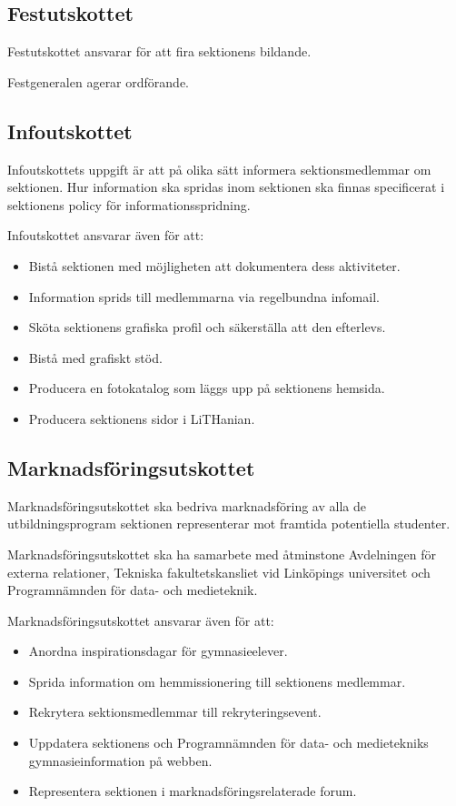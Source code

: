 \documentclass{datateknologsektionen-document}
\begin{document}
\subsection{Festutskottet}
Festutskottet ansvarar för att fira sektionens bildande.

Festgeneralen agerar ordförande.

\subsection{Infoutskottet}
\label{infoutskottet}
Infoutskottets uppgift är att på olika sätt informera sektionsmedlemmar om sektionen.
Hur information ska spridas inom sektionen ska finnas specificerat i sektionens
policy för informationsspridning.

Infoutskottet ansvarar även för att:
\begin{itemize}
  \item Bistå sektionen med möjligheten att dokumentera dess aktiviteter.
  \item Information sprids till medlemmarna via regelbundna infomail.
  \item Sköta sektionens grafiska profil och säkerställa att den efterlevs.
  \item Bistå med grafiskt stöd.
  \item Producera en fotokatalog som läggs upp på sektionens hemsida.
  \item Producera sektionens sidor i LiTHanian.
\end{itemize}

\subsection{Marknadsföringsutskottet}
Marknadsföringsutskottet ska bedriva marknadsföring av alla de utbildningsprogram sektionen representerar mot framtida potentiella studenter.

Marknadsföringsutskottet ska ha samarbete med åtminstone Avdelningen för externa relationer,
Tekniska fakultetskansliet vid Linköpings universitet och Programnämnden för data- och medieteknik.

Marknadsföringsutskottet ansvarar även för att:
\begin{itemize}
  \item Anordna inspirationsdagar för gymnasieelever.
  \item Sprida information om hemmissionering till sektionens medlemmar.
  \item Rekrytera sektionsmedlemmar till rekryteringsevent.
  \item Uppdatera sektionens och Programnämnden för data- och medietekniks gymnasieinformation på webben.
  \item Representera sektionen i marknadsföringsrelaterade forum.
\end{itemize}
\end{document}
